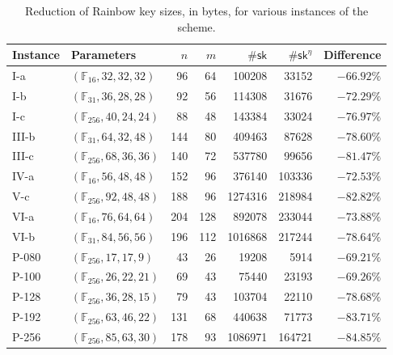 \documentclass[12pt, a4paper, oneside]{memoir}
\theoremstyle{definition}
\begin{document}
\begin{table}[htbp]
  \renewcommand{\arraystretch}{1.2}
  \setlength{\tabcolsep}{6.5pt}
  \centering
  \caption{Reduction of Rainbow key sizes, in bytes, for various instances of the scheme.}\label{tab:1}
  \begin{tabular}{*{2}{l}*{5}{r}}
    \toprule
    Instance & Parameters & $n$ & $m$ & $\#\mathsf{sk}$ & $\#\mathsf{sk}^{\eta}$ & Difference \\ \midrule
    I-a    & $(\mathbb{F}_{ 16}, 32, 32, 32)$  &   96 &   64 &   100208 &   33152 & $-66.92\%$ \\
    I-b    & $(\mathbb{F}_{ 31}, 36, 28, 28)$  &   92 &   56 &   114308 &   31676 & $-72.29\%$ \\
    I-c    & $(\mathbb{F}_{256}, 40, 24, 24)$  &   88 &   48 &   143384 &   33024 & $-76.97\%$ \\
    III-b  & $(\mathbb{F}_{ 31}, 64, 32, 48)$  &  144 &   80 &   409463 &   87628 & $-78.60\%$ \\
    III-c  & $(\mathbb{F}_{256}, 68, 36, 36)$  &  140 &   72 &   537780 &   99656 & $-81.47\%$ \\
    IV-a   & $(\mathbb{F}_{ 16}, 56, 48, 48)$  &  152 &   96 &   376140 &  103336 & $-72.53\%$ \\
    V-c    & $(\mathbb{F}_{256}, 92, 48, 48)$  &  188 &   96 &  1274316 &  218984 & $-82.82\%$ \\
    VI-a   & $(\mathbb{F}_{ 16}, 76, 64, 64)$  &  204 &  128 &   892078 &  233044 & $-73.88\%$ \\
    VI-b   & $(\mathbb{F}_{ 31}, 84, 56, 56)$  &  196 &  112 &  1016868 &  217244 & $-78.64\%$ \\
    P-080  & $(\mathbb{F}_{256}, 17, 17,  9)$  &   43 &   26 &    19208 &    5914 & $-69.21\%$ \\
    P-100  & $(\mathbb{F}_{256}, 26, 22, 21)$  &   69 &   43 &    75440 &   23193 & $-69.26\%$ \\
    P-128  & $(\mathbb{F}_{256}, 36, 28, 15)$  &   79 &   43 &   103704 &   22110 & $-78.68\%$ \\
    P-192  & $(\mathbb{F}_{256}, 63, 46, 22)$  &  131 &   68 &   440638 &   71773 & $-83.71\%$ \\
    P-256  & $(\mathbb{F}_{256}, 85, 63, 30)$  &  178 &   93 &  1086971 &  164721 & $-84.85\%$ \\
    \bottomrule
  \end{tabular}
\end{table}
\end{document}
